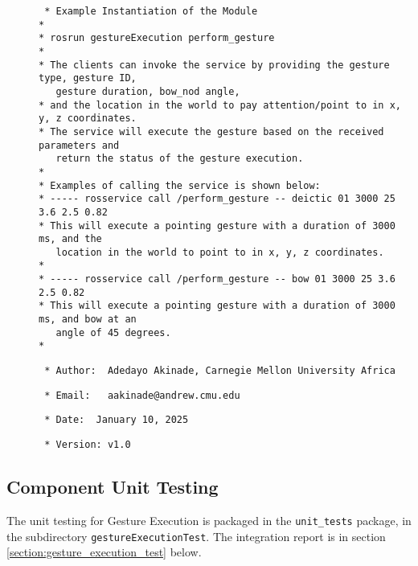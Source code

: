 \documentclass{CSSRforAfrica}
\newcommand{\checkboxChecked}{\fbox{\ding{51}}} %
\begin{document}
\begin{description}
\item[\checkboxChecked] 
 {\small 
\begin{verbatim}
 * Example Instantiation of the Module
*
* rosrun gestureExecution perform_gesture
*
* The clients can invoke the service by providing the gesture type, gesture ID, 
   gesture duration, bow_nod angle, 
* and the location in the world to pay attention/point to in x, y, z coordinates.
* The service will execute the gesture based on the received parameters and 
   return the status of the gesture execution.
*
* Examples of calling the service is shown below:
* ----- rosservice call /perform_gesture -- deictic 01 3000 25 3.6 2.5 0.82
* This will execute a pointing gesture with a duration of 3000 ms, and the 
   location in the world to point to in x, y, z coordinates.
*
* ----- rosservice call /perform_gesture -- bow 01 3000 25 3.6 2.5 0.82
* This will execute a pointing gesture with a duration of 3000 ms, and bow at an 
   angle of 45 degrees.
*
\end{verbatim}}

\item[\checkboxChecked] 
 {\small 
\begin{verbatim}
 * Author:  Adedayo Akinade, Carnegie Mellon University Africa
\end{verbatim}}

\item[\checkboxChecked] 
 {\small 
\begin{verbatim}
 * Email:   aakinade@andrew.cmu.edu
\end{verbatim}}

\item[\checkboxChecked] 
 {\small 
\begin{verbatim}
 * Date:  January 10, 2025
\end{verbatim}}

\item[\checkboxChecked] 
 {\small 
\begin{verbatim}
 * Version: v1.0
\end{verbatim}}


\end{description}


\subsection{Component Unit Testing}
\label{subsection:gesture_execution_unit_testing}

The unit testing for Gesture Execution is packaged in the {\small \verb+unit_tests+} package, in the subdirectory {\small \verb+gestureExecutionTest+}. The integration report is in section \ref{section:gesture_execution_test} below.
\end{document}
